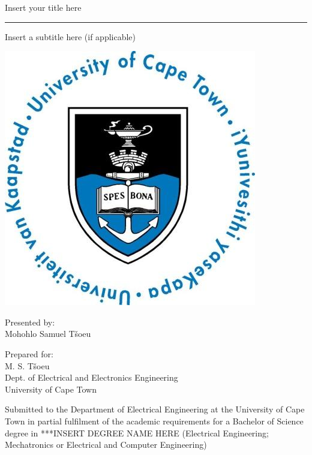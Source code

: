 


 
\thispagestyle{empty}
{\Huge \begin{center}
Insert your title here
\hrule 
{\Large Insert a subtitle here (if applicable)}
\end{center}}

\vskip 5mm
\begin{center}
\includegraphics[scale = 0.3]{uctLogo.png}
\end{center}

\vskip 5mm
\begin{center}
Presented by:\\
Mohohlo Samuel T\v soeu		%
\end{center}

\vskip 10mm
\begin{center}
Prepared for:\\
M. S. T\v soeu\\ 		%
Dept. of Electrical and Electronics Engineering\\University of Cape Town
\end{center}


\vskip 10mm
\begin{center}
Submitted to the Department of Electrical Engineering at the University of Cape Town in partial
fulfilment of the academic requirements for a Bachelor of Science degree in ***INSERT DEGREE
NAME HERE (Electrical Engineering; Mechatronics or Electrical and Computer Engineering)

\end{center}


